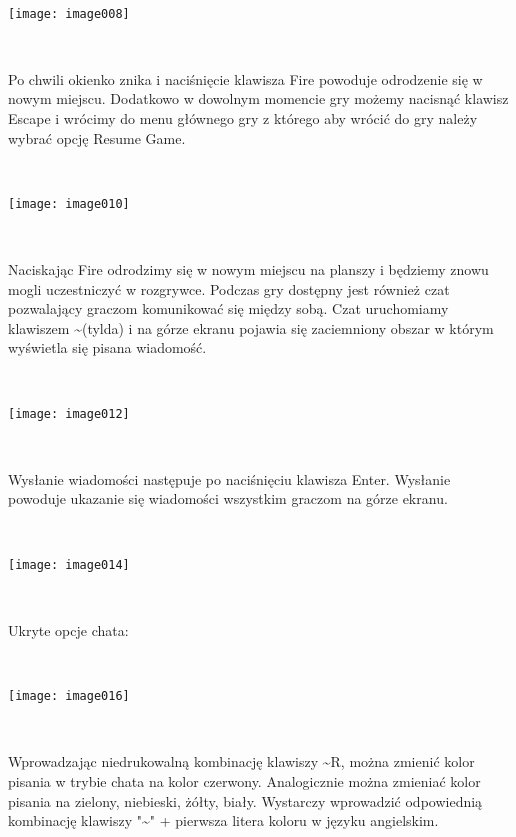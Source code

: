 \documentclass[licencjacka]{pracamgr}
\begin{document}
\begin{center}
\ \

\texttt{[image: image008]}
\end{center}

\ \

Po chwili okienko znika i naciśnięcie klawisza Fire powoduje odrodzenie się w nowym miejscu. Dodatkowo w dowolnym momencie gry możemy nacisnąć klawisz Escape i wrócimy do menu głównego gry z którego aby wrócić do gry należy wybrać opcję Resume Game.

\begin{center}
\ \

\texttt{[image: image010]}
\end{center}

\ \


Naciskając Fire odrodzimy się w nowym miejscu na planszy i będziemy znowu mogli uczestniczyć w rozgrywce.
Podczas gry dostępny jest również czat pozwalający graczom komunikować się między sobą. Czat uruchomiamy klawiszem \textasciitilde (tylda) i na górze ekranu pojawia się zaciemniony obszar w którym wyświetla się pisana wiadomość.

\begin{center}
\ \

\texttt{[image: image012]}
\end{center}

\ \

Wysłanie wiadomości następuje po naciśnięciu klawisza Enter. Wysłanie powoduje ukazanie się wiadomości wszystkim graczom na górze ekranu.

\begin{center}
\ \

\texttt{[image: image014]}
\end{center}

\ \

Ukryte opcje chata:

\begin{center}
\ \

\texttt{[image: image016]}
\end{center}

\ \

Wprowadzając niedrukowalną kombinację klawiszy \textasciitilde R, można zmienić kolor pisania w trybie chata na kolor czerwony.
Analogicznie można zmieniać kolor pisania na zielony, niebieski, żółty, biały.
Wystarczy wprowadzić odpowiednią kombinację klawiszy "\textasciitilde" + pierwsza litera koloru w języku angielskim.
\end{document}
